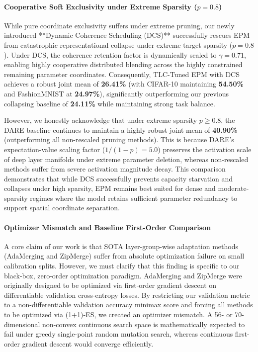 \paragraph{Cooperative Soft Exclusivity under Extreme Sparsity ($p=0.8$)}
While pure coordinate exclusivity suffers under extreme pruning, our newly introduced **Dynamic Coherence Scheduling (DCS)** successfully rescues EPM from catastrophic representational collapse under extreme target sparsity ($p=0.8$). Under DCS, the coherence retention factor is dynamically scaled to $\gamma = 0.71$, enabling highly cooperative distributed blending across the highly constrained remaining parameter coordinates. Consequently, TLC-Tuned EPM with DCS achieves a robust joint mean of \textbf{26.41\%} (with CIFAR-10 maintaining \textbf{54.50\%} and FashionMNIST at \textbf{24.97\%}), significantly outperforming our previous collapsing baseline of \textbf{24.11\%} while maintaining strong task balance. 

However, we honestly acknowledge that under extreme sparsity $p \ge 0.8$, the DARE baseline continues to maintain a highly robust joint mean of \textbf{40.90\%} (outperforming all non-rescaled pruning methods). This is because DARE's expectation-value scaling factor ($1/(1-p) = 5.0$) preserves the activation scale of deep layer manifolds under extreme parameter deletion, whereas non-rescaled methods suffer from severe activation magnitude decay. This comparison demonstrates that while DCS successfully prevents capacity starvation and collapses under high sparsity, EPM remains best suited for dense and moderate-sparsity regimes where the model retains sufficient parameter redundancy to support spatial coordinate separation.

\paragraph{Optimizer Mismatch and Baseline First-Order Comparison}
A core claim of our work is that SOTA layer-group-wise adaptation methods (AdaMerging and ZipMerge) suffer from absolute optimization failure on small calibration splits. However, we must clarify that this finding is specific to our black-box, zero-order optimization paradigm. AdaMerging and ZipMerge were originally designed to be optimized via first-order gradient descent on differentiable validation cross-entropy losses. By restricting our validation metric to a non-differentiable validation accuracy minimax score and forcing all methods to be optimized via (1+1)-ES, we created an optimizer mismatch. A 56- or 70-dimensional non-convex continuous search space is mathematically expected to fail under greedy single-point random mutation search, whereas continuous first-order gradient descent would converge efficiently.


